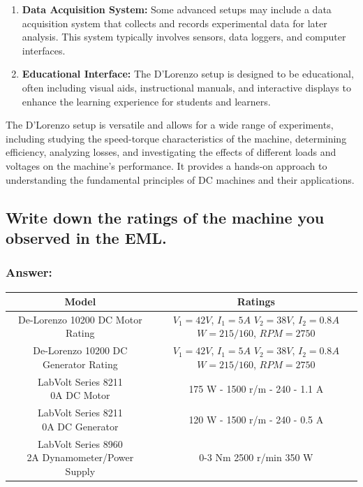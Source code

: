 \documentclass[12pt]{article}
\begin{document}
\begin{enumerate}
    \item \textbf{Data Acquisition System: } Some advanced setups may include a data acquisition system that collects and records experimental data for later analysis. This system typically involves sensors, data loggers, and computer interfaces.
    \item \textbf{Educational Interface: } The D'Lorenzo setup is designed to be educational, often including visual aids, instructional manuals, and interactive displays to enhance the learning experience for students and learners.
\end{enumerate}

The D'Lorenzo setup is versatile and allows for a wide range of experiments, including studying the speed-torque characteristics of the machine, determining efficiency, analyzing losses, and investigating the effects of different loads and voltages on the machine's performance. It provides a hands-on approach to understanding the fundamental principles of DC machines and their applications.

\vspace{0.5cm}
\subsection{Write down the ratings of the machine you observed in the EML.}
\subsubsection*{Answer:}
\begin{center}
    \begin{tabular}{c | c}
        Model & Ratings \\
        \hline\hline

        De-Lorenzo 10200 DC Motor Rating & \makecell{$V_1 = 42 V$, $I_1 = 5 A$\\ $V_2 = 38 V$,  $I_2 = 0.8 A$\\ $W = 215/160$,  $RPM = 2750$} \\\hline

        De-Lorenzo 10200 DC Generator Rating & \makecell{$V_1 = 42 V$, $I_1 = 5 A$\\ $V_2 = 38 V$,  $I_2 = 0.8 A$\\ $W = 215/160$,  $RPM = 2750$} \\\hline

        \makecell{LabVolt Series 8211 \\ 0A DC Motor} & 175 W - 1500 r/m - 240 - 1.1 A \\\hline

        \makecell{LabVolt Series 8211 \\ 0A DC Generator} & 120 W - 1500 r/m - 240 - 0.5 A \\\hline

        \makecell{LabVolt Series 8960 \\ 2A Dynamometer/Power Supply} & 0-3 Nm 2500 r/min 350 W \\\hline
    \end{tabular}
\end{center}
\end{document}
